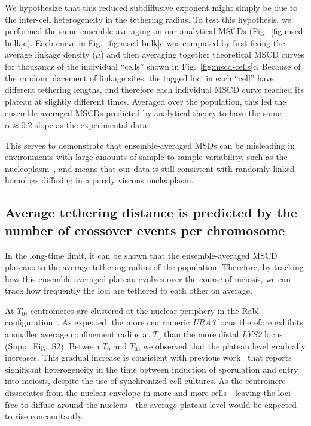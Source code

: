 \documentclass[9pt,twocolumn,twoside,lineno]{pnas-new}
\begin{document}
We hypothesize that this reduced subdiffusive exponent might simply be due to the inter-cell heterogeneity in the tethering radius.
To test this hypothesis, we performed the same ensemble averaging on our analytical MSCDs (Fig.~\ref{fig:mscd-bulk}c). Each curve in Fig.~\ref{fig:mscd-bulk}c was computed by first fixing the average linkage density ($\mu$) and then averaging together theoretical MSCD curves for thousands of the individual ``cells'' shown in Fig.~\ref{fig:mscd-cells}c. Because of the random placement of linkage sites, the tagged loci in each ``cell'' have different tethering lengths, and therefore each individual MSCD curve reached its plateau at slightly different times. Averaged over the population, this led the ensemble-averaged MSCDs predicted by analytical theory to have the same $\alpha\approx 0.2$ slope as the experimental data.

This serves to demonstrate that ensemble-averaged MSDs can be misleading in environments with large amounts of sample-to-sample variability, such as the nucleoplasm~\cite{lampo2017}, and means that our data is still consistent with randomly-linked homologs diffusing in a purely viscous nucleoplasm.

\subsection*{Average tethering distance is predicted by the number of crossover events per chromosome}

In the long-time limit, it can be shown that the ensemble-averaged MSCD plateaus to the average tethering radius of the population.
Therefore, by tracking how this ensemble averaged plateau evolves over the course of meiosis, we can track how frequently the loci are tethered to each other on average.

At $T_0$, centromeres are clustered at the nuclear periphery in the Rabl configuration~\cite{jin2000}.
As expected, the more centromeric \textit{URA3} locus therefore exhibits a smaller average confinement radius at $T_0$ than the more distal \textit{LYS2} locus (Supp.\ Fig.\ S2).
Between $T_0$ and $T_3$, we observed that the plateau level gradually increases.
This gradual increase is consistent with previous work~\cite{cha2000} that reports significant heterogeneity in the time between induction of sporulation and entry into meiosis, despite the use of synchronized cell cultures.
As the centromere dissociates from the nuclear envelope in more and more cells---leaving the loci free to diffuse around the nucleus---the average plateau level would be expected to rise concomitantly.
\end{document}

